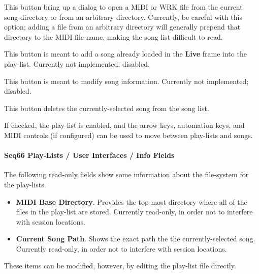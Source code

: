    \setcounter{ItemCounter}{0}      %

   This button bring up a dialog to open a MIDI or WRK file from
   the current song-directory or from an arbitrary directory.
   Currently, be careful with this option; adding a file from an arbitrary
   directory will generally prepend that directory to the MIDI file-name,
   making the song list difficult to read.

   This button is meant to add a song already loaded in the \textbf{Live} frame
   into the play-list.
   Currently not implemented; disabled.

   This button is meant to modify song information.
   Currently not implemented; disabled.

   This button deletes the currently-selected song from the song list.

   If checked, the play-list is enabled, and the arrow keys, automation keys,
   and MIDI controls (if configured) can be used to move between play-lists and
   songs.

\paragraph{Seq66 Play-Lists / User Interfaces / Info Fields}
\label{paragraph:playlist_ui_qt_playlist_buttons}

   The following read-only fields show some information about the file-system
   for the play-lists.

   \begin{itemize}
      \item \textbf{MIDI Base Directory}.
         Provides the top-most directory where all of the files in the
         play-list are stored.
         Currently read-only, in order not to interfere with session locations.
      \item \textbf{Current Song Path}.
         Shows the exact path the the currently-selected song.
         Currently read-only, in order not to interfere with session locations.
   \end{itemize}

   These items can be modified, however, by editing the play-list file
   directly.

